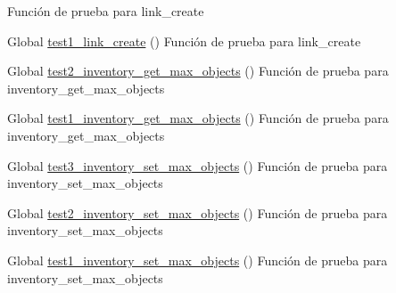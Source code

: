 \begin{DoxyRefList}
%
Función de prueba para link\+\_\+create  
\item[Global \mbox{\hyperlink{link__test_8c_a82c5ee441ad22caad8272212a9e9cc26}{test1\+\_\+link\+\_\+create}} ()]\label{test__test000101}%
%
Función de prueba para link\+\_\+create  
\item[Global \mbox{\hyperlink{inventory__test_8c_ac75954611acab583f780145532ab3197}{test2\+\_\+inventory\+\_\+get\+\_\+max\+\_\+objects}} ()]\label{test__test000100}%
%
Función de prueba para inventory\+\_\+get\+\_\+max\+\_\+objects  
\item[Global \mbox{\hyperlink{inventory__test_8c_a17c5d7d6ecb4161696deca0155e13f4f}{test1\+\_\+inventory\+\_\+get\+\_\+max\+\_\+objects}} ()]\label{test__test000099}%
%
Función de prueba para inventory\+\_\+get\+\_\+max\+\_\+objects  
\item[Global \mbox{\hyperlink{inventory__test_8c_a270c2d6aecda0d73fbcff6ca0c9a90db}{test3\+\_\+inventory\+\_\+set\+\_\+max\+\_\+objects}} ()]\label{test__test000098}%
%
Función de prueba para inventory\+\_\+set\+\_\+max\+\_\+objects  
\item[Global \mbox{\hyperlink{inventory__test_8c_aff93a7fb7ffbac1890ce563012a9d372}{test2\+\_\+inventory\+\_\+set\+\_\+max\+\_\+objects}} ()]\label{test__test000097}%
%
Función de prueba para inventory\+\_\+set\+\_\+max\+\_\+objects  
\item[Global \mbox{\hyperlink{inventory__test_8c_aedc895d6409678b2176d822c105c3796}{test1\+\_\+inventory\+\_\+set\+\_\+max\+\_\+objects}} ()]\label{test__test000096}%
%
Función de prueba para inventory\+\_\+set\+\_\+max\+\_\+objects 
\end{DoxyRefList}